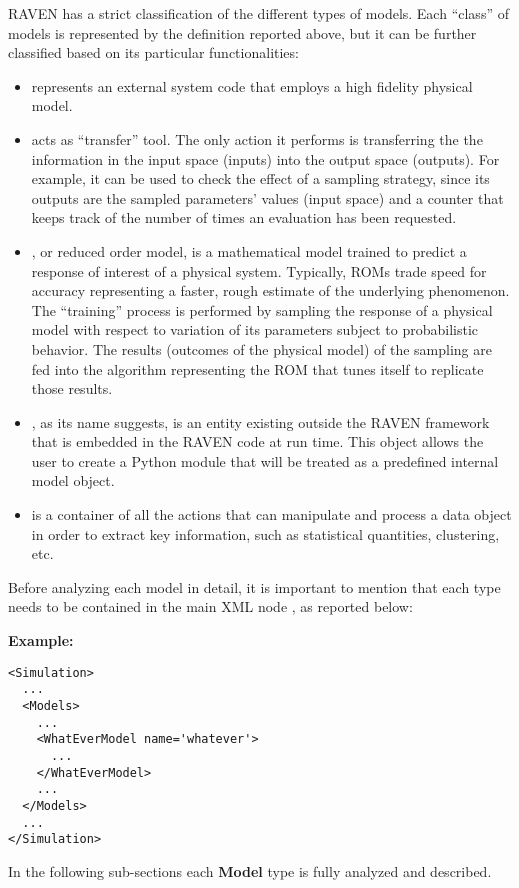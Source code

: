 RAVEN has a strict classification of the different types of models.
%
Each ``class'' of models is represented by the definition reported above, but it
can be further classified based on its particular functionalities:
\begin{itemize}
  \item {} represents an external system code that employs a high
  fidelity physical model.
  \item {} acts as ``transfer'' tool.
  The only action it performs is transferring the the information in the input
  space (inputs) into the output space (outputs).
  For example, it can be used to check the effect of a sampling strategy, since
  its outputs are the sampled parameters' values (input space) and a counter
  that keeps track of the number of times an evaluation has been requested.
  \item {}, or reduced order model, is a mathematical model trained
  to predict a response of interest of a physical system.
  Typically, ROMs trade speed for accuracy representing a faster, rough estimate
  of the underlying phenomenon.
  The ``training'' process is performed by sampling the response of a physical
  model with respect to variation of its parameters subject to probabilistic
  behavior.
  The results (outcomes of the physical model) of the sampling are fed into
  the algorithm representing the ROM that tunes itself to replicate those
  results.
  \item {}, as its name suggests, is an entity existing
  outside the RAVEN framework that is embedded in the RAVEN code at run time.
  This object allows the user to create a Python module that will be treated as
  a predefined internal model object.
  \item {} is a container of all the actions that can
  manipulate and process a data object in order to extract key information,
  such as statistical quantities, clustering, etc.
\end{itemize}
Before analyzing each model in detail, it is important to mention that each
type needs to be contained in the main XML node , as reported
below:

\textbf{Example:}
\begin{lstlisting}[style=XML]
<Simulation>
  ...
  <Models>
    ...
    <WhatEverModel name='whatever'>
      ...
    </WhatEverModel>
    ...
  </Models>
  ...
</Simulation>
\end{lstlisting}
In the following sub-sections each \textbf{Model} type is fully analyzed and
described.
%
